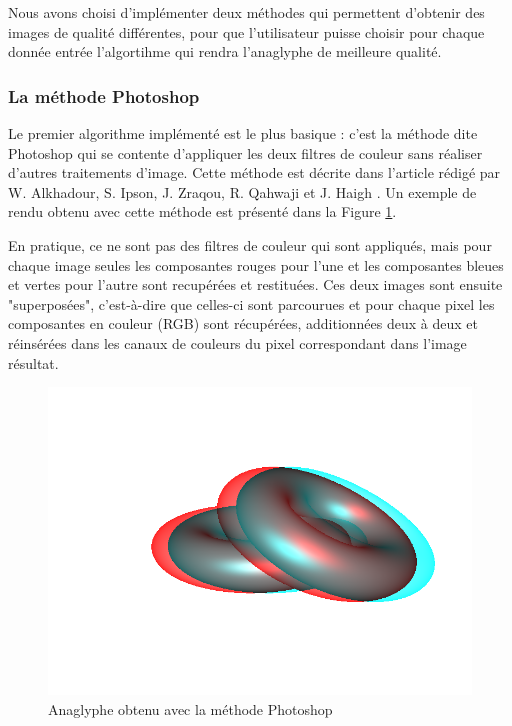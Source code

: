 	Nous avons choisi d'implémenter deux méthodes qui permettent d'obtenir des images de qualité différentes, pour que l'utilisateur puisse choisir pour chaque donnée entrée l'algortihme qui rendra l'anaglyphe de meilleure qualité. %
	  
\subsubsection{La méthode Photoshop}
	Le premier algorithme implémenté est le plus basique : c'est la méthode dite Photoshop qui se contente d'appliquer les deux filtres de couleur sans réaliser d'autres traitements d'image. Cette méthode est décrite dans l'article rédigé par W. Alkhadour, S. Ipson, J. Zraqou, R. Qahwaji et J. Haigh \cite{steteroAnaglyph}. Un exemple de rendu obtenu avec cette méthode est présenté dans la Figure \ref{fig:photoshop}.
		
	En pratique, ce ne sont pas des filtres de couleur qui sont appliqués, mais pour chaque image seules les composantes rouges pour l'une et les composantes bleues et vertes pour l'autre sont recupérées et restituées. Ces deux images sont ensuite "superposées", c'est-à-dire que celles-ci sont parcourues et pour chaque pixel les composantes en couleur (RGB) sont récupérées, additionnées deux à deux et réinsérées dans les canaux de couleurs du pixel correspondant dans l'image résultat. %
	
\begin{figure}[h]
	\centering
	\includegraphics[scale=0.3]{photoshop.png}
	\caption{\label{fig:photoshop} Anaglyphe obtenu avec la méthode Photoshop \protect}
\end{figure}
		
